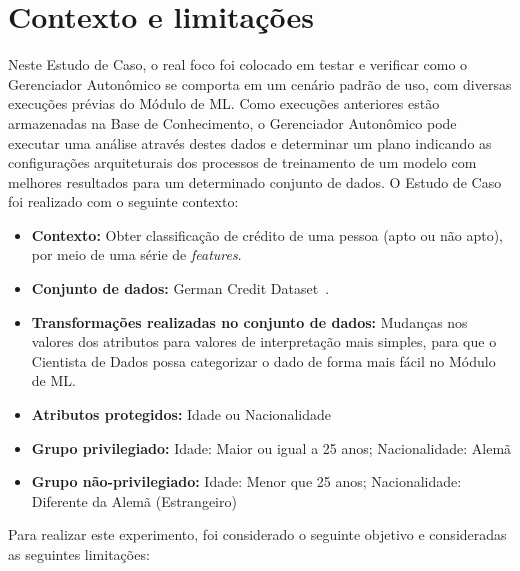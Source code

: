 \documentclass[portugues]{ic-tese}
\begin{document}
\section{Contexto e limitações}

Neste Estudo de Caso, o real foco foi colocado em testar e verificar como o Gerenciador Autonômico se comporta em um cenário padrão de uso, com diversas execuções prévias do Módulo de ML. Como execuções anteriores estão armazenadas na Base de Conhecimento, o Gerenciador Autonômico pode executar uma análise através destes dados e determinar um plano indicando as configurações arquiteturais dos processos de treinamento de um modelo com melhores resultados para um determinado conjunto de dados. O Estudo de Caso foi realizado com o seguinte contexto:

\begin{itemize}
\item \textbf{Contexto:} Obter classificação de crédito de uma pessoa (apto ou não apto), por meio de uma série de \textit{features}.

\item \textbf{Conjunto de dados:} German Credit Dataset~\citep{ucigerman_2021}.

\item \textbf{Transformações realizadas no conjunto de dados:} Mudanças nos valores dos atributos para valores de interpretação mais simples, para que o Cientista de Dados possa categorizar o dado de forma mais fácil no Módulo de ML.

\item \textbf{Atributos protegidos:} Idade ou Nacionalidade

\item \textbf{Grupo privilegiado:} Idade: Maior ou igual a 25 anos; Nacionalidade: Alemã

\item \textbf{Grupo não-privilegiado:} Idade: Menor que 25 anos; Nacionalidade: Diferente da Alemã (Estrangeiro)

\end{itemize}

Para realizar este experimento, foi considerado o seguinte objetivo e consideradas as seguintes limitações:
\end{document}
